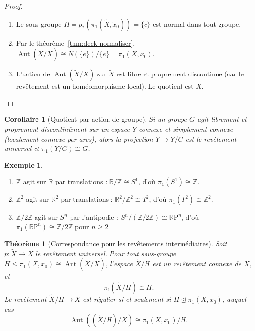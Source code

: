 \documentclass[12pt,a4paper,openany]{book}
\theoremstyle{definition}
\newtheorem{exemple}[definition]{Exemple}
\theoremstyle{plain}
\newtheorem{theoreme}[definition]{Théorème}
\newtheorem{corollaire}[definition]{Corollaire}
\theoremstyle{remark}
\newcommand{\Z}{\mathbb{Z}}
\newcommand{\R}{\mathbb{R}}
\newcommand{\RP}{\mathbb{R}\mathrm{P}}
\DeclareMathOperator{\Aut}{Aut}
\begin{document}
\begin{proof}
\begin{enumerate}[label=(\roman*)]
\item Le sous-groupe $H = p_*(\pi_1(\widetilde{X}, \tilde{x}_0)) = \{e\}$ est normal
dans tout groupe.
\item Par le théorème~\ref{thm:deck-normaliser},
$\Aut(\widetilde{X}/X) \cong N(\{e\})/\{e\} = \pi_1(X, x_0)$.
\item L'action de $\Aut(\widetilde{X}/X)$ sur $\widetilde{X}$ est libre et proprement
discontinue (car le revêtement est un homéomorphisme local). Le quotient est $X$.
\qedhere
\end{enumerate}
\end{proof}

\begin{corollaire}[Quotient par action de groupe]\label{cor:quotient-action}
Si un groupe $G$ agit librement et proprement discontinûment sur un espace $Y$
connexe et simplement connexe (localement connexe par arcs), alors la projection
$Y \to Y/G$ est le revêtement universel et $\pi_1(Y/G) \cong G$.
\end{corollaire}

\begin{exemple}\label{ex:applications-quotient}
\begin{enumerate}[label=(\roman*)]
\item $\Z$ agit sur $\R$ par translations : $\R / \Z \cong S^1$, d'où $\pi_1(S^1) \cong \Z$.
\item $\Z^2$ agit sur $\R^2$ par translations : $\R^2 / \Z^2 \cong T^2$, d'où $\pi_1(T^2) \cong \Z^2$.
\item $\Z/2\Z$ agit sur $S^n$ par l'antipodie : $S^n / (\Z/2\Z) \cong \RP^n$,
d'où $\pi_1(\RP^n) \cong \Z/2\Z$ pour $n \geq 2$.
\end{enumerate}
\end{exemple}

\begin{theoreme}[Correspondance pour les revêtements intermédiaires]\label{thm:rev-intermediaire}
Soit $p \colon \widetilde{X} \to X$ le revêtement universel. Pour tout sous-groupe
$H \leq \pi_1(X, x_0) \cong \Aut(\widetilde{X}/X)$, l'espace $\widetilde{X}/H$ est
un revêtement connexe de $X$, et
\[
\pi_1(\widetilde{X}/H) \cong H.
\]
Le revêtement $\widetilde{X}/H \to X$ est régulier si et seulement si $H \trianglelefteq \pi_1(X, x_0)$,
auquel cas
\[
\Aut((\widetilde{X}/H) / X) \cong \pi_1(X, x_0) / H.
\]
\end{theoreme}
\end{document}
